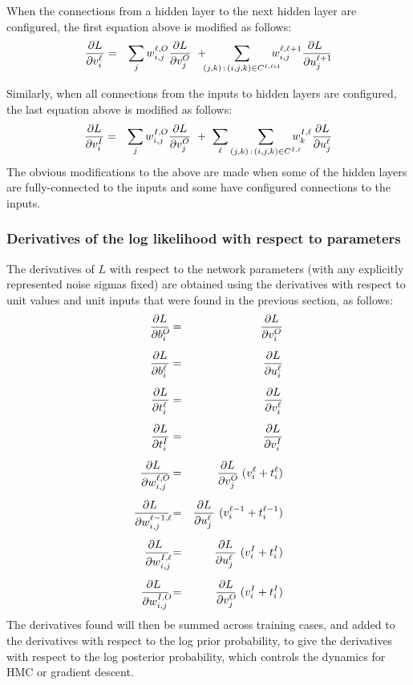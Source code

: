 \documentclass{report}[11pt]
\def\beq{\begin{eqnarray}}
\def\eeq{\end{eqnarray}}
\begin{document}
When the connections from a hidden layer to the next hidden layer are
configured, the first equation above is modified as follows:\beq
  {\partial L \over \partial v^{\ell}_{i\ }\!} & = & 
    \sum_j w^{\ell,O}_{i,j} {\partial L \over \partial v^O_j} \ +\!\!\!
   \sum_{(j,k)\,:\, (i,j,k)\in C^{\ell,\ell\!+\!1}}\!\!\!\!\!\!    
     w^{\ell,\ell+1}_{i,j} {\partial L\ \over \partial u^{\ell+1}_j\! }
\eeq

Similarly, when all connections from the inputs to hidden layers are
configured, the last equation above is modified as follows:\beq
  {\partial L \over \partial v^I_{i\ }\!} & = & 
    \sum_j w^{I,O}_{i,j} {\partial L \over \partial v^O_j}\ +\
    \sum_{\ell} 
         \sum_{(j,k)\,:\, (i,j,k)\in C^{I,\ell}}\!\!\!\!\!\!
             w^{I,\ell}_k {\partial L \over \partial u^{\ell}_j }
\eeq%
The obvious modifications to the above are made when some of the 
hidden layers are fully-connected to the inputs and some have
configured connections to the inputs.

\subsubsection*{Derivatives of the log likelihood with respect to parameters}

The derivatives of $L$ with respect to the network parameters (with
any explicitly represented noise sigmas fixed) are obtained using the
derivatives with respect to unit values and unit inputs that were found in 
the previous section, as follows:\beq
  {\partial L \over \partial b^O_{i\ }\!} & = & 
    {\partial L \over \partial v^O_i} \\[5pt]
  {\partial L \over \partial b^{\ell}_{i\ }\!} & = & 
    {\partial L \over \partial u^{\ell}_i} \\[5pt]
  {\partial L \over \partial t^{\ell}_{i\ }\!} & = & 
    {\partial L \over \partial v^{\ell}_i} \\[5pt]
  {\partial L \over \partial t^I_{i\ }\!} & = & 
    {\partial L \over \partial v^I_i} \\[5pt]
  {\partial L\ \over \partial w^{\ell,O}_{i,j}\!} & = &
    {\partial L \over \partial v^O_{j\ }\!}\ (v^{\ell}_i+t^{\ell}_i) \\[5pt]
  {\partial L\ \over \partial w^{\ell-1,\ell}_{i,j}\!\!} & = &
    {\partial L \over \partial u^{\ell}_{j\ }\!}\ (v^{\ell-1}_i+t^{\ell-1}_i)
    \\[5pt]
  {\partial L\ \over \partial w^{I,\ell}_{i,j}\!\!} & = &
    {\partial L \over \partial u^{\ell}_{j\ }\!}\ (v^I_i+t^I_i) \\[5pt]
  {\partial L\ \over \partial w^{I,O}_{i,j}\!\!} & = &
    {\partial L \over \partial v^O_{j\ }\!}\ (v^I_i+t^I_i) 
\eeq%
The derivatives found will then be summed across training cases, and 
added to the derivatives with respect to the log prior probability, to
give the derivatives with respect to the log posterior probability,
which controls the dynamics for HMC or gradient descent.
\end{document}
